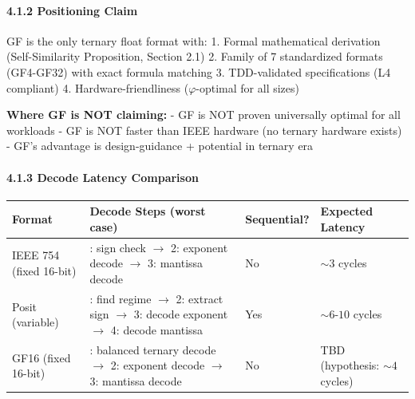 \paragraph{4.1.2 Positioning Claim}\label{positioning-claim}

GF is the only ternary float format with: 1. Formal mathematical
derivation (Self-Similarity Proposition, Section 2.1) 2. Family of 7
standardized formats (GF4-GF32) with exact formula matching 3.
TDD-validated specifications (L4 compliant) 4. Hardware-friendliness
(\(\varphi\)-optimal for all sizes)

\textbf{Where GF is NOT claiming:} - GF is NOT proven universally
optimal for all workloads - GF is NOT faster than IEEE hardware (no
ternary hardware exists) - GF's advantage is design-guidance + potential
in ternary era

\paragraph{4.1.3 Decode Latency
Comparison}\label{decode-latency-comparison}

{\def\LTcaptype{none} %
\begin{longtable}[]{@{}
  >{\raggedright\arraybackslash}p{}
  >{\raggedright\arraybackslash}p{}
  >{\raggedright\arraybackslash}p{}
  >{\raggedright\arraybackslash}p{}@{}}
\toprule\noalign{}
\begin{minipage}[b]{\linewidth}\raggedright
Format
\end{minipage} & \begin{minipage}[b]{\linewidth}\raggedright
Decode Steps (worst case)
\end{minipage} & \begin{minipage}[b]{\linewidth}\raggedright
Sequential?
\end{minipage} & \begin{minipage}[b]{\linewidth}\raggedright
Expected Latency
\end{minipage} \\
\midrule\noalign{}
\endhead
\bottomrule\noalign{}
\endlastfoot
IEEE 754 (fixed 16-bit) & 1: sign check \(\to\) 2: exponent decode
\(\to\) 3: mantissa decode & No & \(\sim 3\) cycles \\
Posit (variable) & 1: find regime \(\to\) 2: extract sign \(\to\) 3:
decode exponent \(\to\) 4: decode mantissa & Yes & \(\sim 6\)-\(10\)
cycles \\
GF16 (fixed 16-bit) & 1: balanced ternary decode \(\to\) 2: exponent
decode \(\to\) 3: mantissa decode & No & TBD (hypothesis: \(\sim 4\)
cycles) \\
\end{longtable}
}

